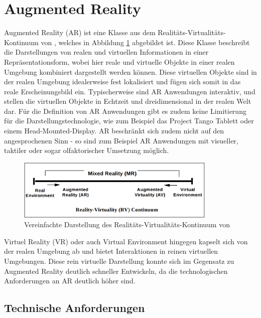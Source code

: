 
\section{Augmented Reality}

Augmented Reality (AR) ist eine Klasse aus dem Realitäts-Virtualitäts-Kontinuum von \cite{milgram1995augmented}, welches in Abbildung \ref{fig:virtual-continuum} abgebildet ist. Diese Klasse beschreibt die Darstellungen von realen und virtuellen Informationen in einer Repräsentationsform, wobei hier reale und virtuelle Objekte in einer realen Umgebung kombiniert dargestellt werden können. Diese virtuellen Objekte sind in der realen Umgebung idealerweise fest lokalisiert und fügen sich somit in das reale Erscheinungsbild ein. Typischerweise sind AR Anwendungen interaktiv, und stellen die virtuellen Objekte in Echtzeit und dreidimensional in der realen Welt dar. Für die Definition von AR Anwendungen gibt es zudem keine Limitierung für die Darstellungstechnologie, wie zum Beispiel das Project Tango Tablett oder einem Head-Mounted-Display. AR beschränkt sich zudem nicht auf den angesprochenen Sinn - so sind zum Beispiel AR Anwendungen mit visueller, taktiler oder sogar olfaktorischer Umsetzung möglich.\\

\begin{figure}
  \centering
	\includegraphics[width=0.85\textwidth]{content/images/theory/virtual-continuum.png} 
  \caption{Vereinfachte Darstellung des Realitäts-Virtualitäts-Kontinuum von \citet*{milgram1995augmented}}
  \label{fig:virtual-continuum}
\end{figure}


Virtuel Reality (VR) oder auch Virtual Environment hingegen kapselt sich von der realen Umgebung ab und bietet Interaktionen in reinen virtuellen Umgebungen. Diese rein virtuelle Darstellung konnte sich im Gegensatz zu Augmented Reality deutlich schneller Entwickeln, da die technologischen Anforderungen an AR deutlich höher sind. \citep{van2010survey}\\

\subsection{Technische Anforderungen}

